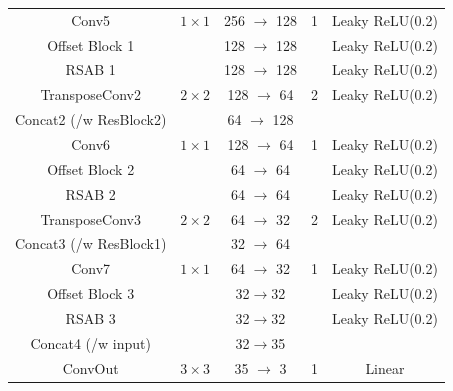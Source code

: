 \begin{table}[t!]
\begin{tabular}{c|c|c|c|c}
Conv5                   & $1\times1$           & 256 $\rightarrow$ 128   & 1               & Leaky ReLU(0.2)        \\
Offset Block 1          &                      & 128 $\rightarrow$ 128   &                 & Leaky ReLU(0.2)        \\
RSAB 1                  &                      & 128 $\rightarrow$ 128   &                 & Leaky ReLU(0.2)        \\ \hline
TransposeConv2          & $2\times2$           & 128 $\rightarrow$ 64    & 2               & Leaky ReLU(0.2)        \\
Concat2 (/w ResBlock2)  &                      & 64 $\rightarrow$ 128    &                 &                        \\
Conv6                   & $1\times1$           & 128 $\rightarrow$ 64    & 1               & Leaky ReLU(0.2)        \\
Offset Block 2          &                      & 64 $\rightarrow$ 64     &                 & Leaky ReLU(0.2)        \\
RSAB 2                  &                      & 64 $\rightarrow$ 64     &                 & Leaky ReLU(0.2)        \\ \hline
TransposeConv3          & $2\times2$           & 64 $\rightarrow$ 32     & 2               & Leaky ReLU(0.2)        \\
Concat3 (/w ResBlock1)  &                      & 32 $\rightarrow$ 64     &                 &                        \\
Conv7                   & $1\times1$           & 64 $\rightarrow$ 32     & 1               & Leaky ReLU(0.2)        \\
Offset Block 3          &                      & 32$\rightarrow$32       &                 & Leaky ReLU(0.2)        \\
RSAB 3                  &                      & 32$\rightarrow$32       &                 & Leaky ReLU(0.2)        \\ \hline
Concat4 (/w input)      &                      & 32$\rightarrow$35       &                 &                        \\
ConvOut                 & $3\times3$           & 35 $\rightarrow$ 3      & 1               & Linear                
\end{tabular}
\end{table}



